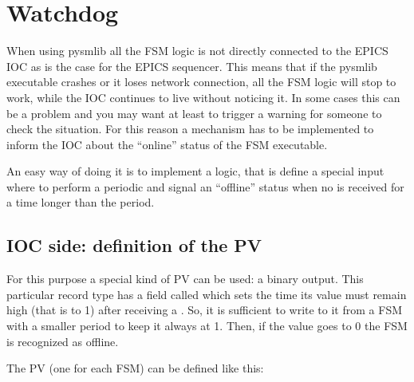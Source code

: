 \documentclass[letterpaper,10pt,english]{sphinxmanual}
\begin{document}
\section{Watchdog}
\label{\detokenize{watchdog:watchdog}}\label{\detokenize{watchdog:id1}}\label{\detokenize{watchdog::doc}}
When using pysmlib all the FSM logic is not directly connected to the EPICS IOC
as is the case for the EPICS sequencer. This means that if the pysmlib
executable crashes or it loses network connection, all the FSM logic will stop
to work, while the IOC continues to live without noticing it. In some cases this
can be a problem and you may want at least to trigger a warning for someone to
check the situation. For this reason a mechanism has to be implemented to inform
the IOC about the “online” status of the FSM executable.

An easy way of doing it is to implement a  logic, that is define a
special input where to perform a periodic {\hyperref[\detokenize{io:put}]{}} and signal an “offline”
status when no {\hyperref[\detokenize{io:put}]{}} is received for a time longer than the period.


\subsection{IOC side: definition of the PV}
\label{\detokenize{watchdog:ioc-side-definition-of-the-pv}}
For this purpose a special kind of PV can be used: a binary output. This
particular record type has a field called  which sets the time its value
must remain high (that is to 1) after receiving a . So, it is
sufficient to write to it from a FSM with a smaller period to keep it always at
1. Then, if the value goes to 0 the FSM is recognized as offline.

The PV (one for each FSM) can be defined like this:

%
\begin{sphinxVerbatim}[commandchars=\\\{\}]
   
      
      
      
        
      
      
      
\end{sphinxVerbatim}
\end{document}

